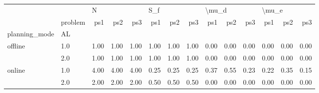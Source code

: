 \begin{tabular}{llrrrrrrrrrrrr}
\toprule
       & {} & \multicolumn{3}{l}{N} & \multicolumn{3}{l}{S\_f} & \multicolumn{3}{l}{\textbackslash mu\_d} & \multicolumn{3}{l}{\textbackslash mu\_e} \\
       & problem &  ps1 &  ps2 &  ps3 &  ps1 &  ps2 &  ps3 &   ps1 &  ps2 &  ps3 &   ps1 &  ps2 &  ps3 \\
planning\_mode & AL &      &      &      &      &      &      &       &      &      &       &      &      \\
\midrule
offline & 1.0 & 1.00 & 1.00 & 1.00 & 1.00 & 1.00 & 1.00 &  0.00 & 0.00 & 0.00 &  0.00 & 0.00 & 0.00 \\
       & 2.0 & 1.00 & 1.00 & 1.00 & 1.00 & 1.00 & 1.00 &  0.00 & 0.00 & 0.00 &  0.00 & 0.00 & 0.00 \\
online & 1.0 & 4.00 & 4.00 & 4.00 & 0.25 & 0.25 & 0.25 &  0.37 & 0.55 & 0.23 &  0.22 & 0.35 & 0.15 \\
       & 2.0 & 2.00 & 2.00 & 2.00 & 0.50 & 0.50 & 0.50 &  0.00 & 0.00 & 0.00 &  0.00 & 0.00 & 0.00 \\
\bottomrule
\end{tabular}
